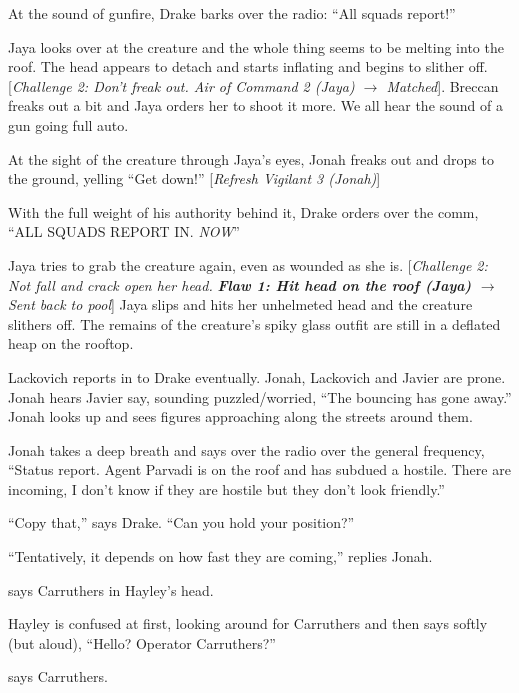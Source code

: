 At the sound of gunfire, Drake barks over the radio: ``All squads report!''

Jaya looks over at the creature and the whole thing seems to be melting into the roof.  The head appears to detach and starts inflating and begins to slither off.  {[}\textit{Challenge 2: Don't freak out. Air of Command 2 (Jaya) $\rightarrow$ Matched}{]}.   Breccan freaks out a bit and Jaya orders her to shoot it more.  We all hear the sound of a gun going full auto.

At the sight of the creature through Jaya's eyes, Jonah freaks out and drops to the ground, yelling ``Get down!''  {[}\textit{Refresh Vigilant 3 (Jonah)}{]}



With the full weight of his authority behind it, Drake orders over the comm, ``ALL SQUADS REPORT IN.  \textit{NOW}''



Jaya tries to grab the creature again, even as wounded as she is.  {[}\textit{Challenge 2: Not fall and crack open her head.  }\textit{\textbf{ {\color[RGB]{255,0,0}Flaw 1: Hit head on the roof (Jaya) } }}\textit{$\rightarrow$ Sent back to pool}{]}  Jaya slips and hits her unhelmeted head and the creature slithers off.  The remains of the creature's spiky glass outfit are still in a deflated heap on the rooftop.



Lackovich reports in to Drake eventually.  Jonah, Lackovich and Javier are prone.  Jonah hears Javier say, sounding puzzled/worried, ``The bouncing has gone away.''  Jonah looks up and sees figures approaching along the streets around them.

Jonah takes a deep breath and says over the radio over the general frequency, ``Status report. Agent Parvadi is on the roof and has subdued a hostile.  There are incoming, I don't know if they are hostile but they don't look friendly.''

``Copy that,'' says Drake.  ``Can you hold your position?''

``Tentatively, it depends on how fast they are coming,'' replies Jonah.



 says Carruthers in Hayley's head.

Hayley is confused at first, looking around for Carruthers and then says softly (but aloud), ``Hello?  Operator Carruthers?''

 says Carruthers.

